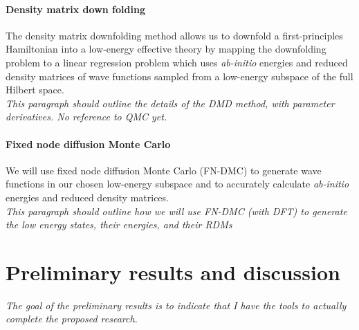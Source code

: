 \documentclass{article}
\begin{document}
\paragraph{Density matrix down folding} 
The density matrix downfolding method allows us to downfold a first-principles Hamiltonian into a low-energy effective theory by mapping the downfolding problem to a linear regression problem which uses \textit{ab-initio} energies and reduced density matrices of wave functions sampled from a low-energy subspace of the full Hilbert space.
\\
\textit{This paragraph should outline the details of the DMD method, with parameter derivatives. No reference to QMC yet.}

\paragraph{Fixed node diffusion Monte Carlo}
We will use fixed node diffusion Monte Carlo (FN-DMC) to generate wave functions in our chosen low-energy subspace and to accurately calculate \textit{ab-initio} energies and reduced density matrices.
\\
\textit{This paragraph should outline how we will use FN-DMC (with DFT) to generate the low energy states, their energies, and their RDMs}




\pagebreak

\section{Preliminary results and discussion}
\textit{The goal of the preliminary results is to indicate that I have the tools to actually complete the proposed research.}
\end{document}
